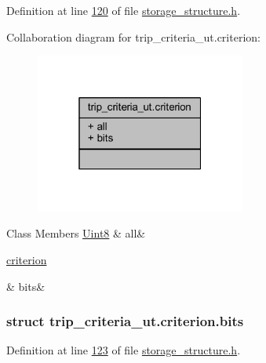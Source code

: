 Definition at line \hyperlink{a00003_source_l00120}{120} of file \hyperlink{a00003_source}{storage\+\_\+structure.\+h}.



Collaboration diagram for trip\+\_\+criteria\+\_\+ut.\+criterion\+:
\nopagebreak
\begin{figure}[H]
\begin{center}
\leavevmode
\includegraphics[width=196pt]{dc/d55/a00226}
\end{center}
\end{figure}
\begin{DoxyFields}{Class Members}
\hypertarget{a00003_aa181a603769c1f98ad927e7367c7aa51}{\hyperlink{a00001_a979e3e23b9a449e69ab6a8a83b6042f8}{Uint8}}\label{a00003_aa181a603769c1f98ad927e7367c7aa51}
&
all&
\\
\hline

\hypertarget{a00003_acc411e6c13670e52124629b8ac83f7d0}{\hyperlink{a00003_d7/dce/a00143}{criterion}}\label{a00003_acc411e6c13670e52124629b8ac83f7d0}
&
bits&
\\
\hline

\end{DoxyFields}
\label{d7/dce/a00143}
\hypertarget{a00003_d7/dce/a00143}{}
\subsubsection{struct trip\+\_\+criteria\+\_\+ut.\+criterion.\+bits}


Definition at line \hyperlink{a00003_source_l00123}{123} of file \hyperlink{a00003_source}{storage\+\_\+structure.\+h}.



